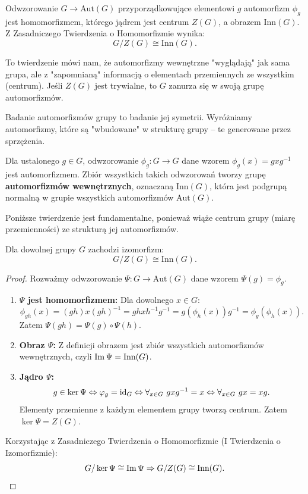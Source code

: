 \begin{theorem}
Odwzorowanie $G \to \text{Aut}(G)$ przyporządkowujące elementowi $g$ automorfizm $\phi_g$ jest homomorfizmem, którego jądrem jest centrum $Z(G)$, a obrazem $\text{Inn}(G)$.
Z Zasadniczego Twierdzenia o Homomorfizmie wynika:
\[ G / Z(G) \cong \text{Inn}(G). \]
\end{theorem}

\begin{proposition}
To twierdzenie mówi nam, że automorfizmy wewnętrzne "wyglądają" jak sama grupa, ale z "zapomnianą" informacją o elementach przemiennych ze wszystkim (centrum). Jeśli $Z(G)$ jest trywialne, to $G$ zanurza się w swoją grupę automorfizmów.
\end{proposition}

Badanie automorfizmów grupy to badanie jej symetrii. Wyróżniamy automorfizmy, które są "wbudowane" w strukturę grupy – te generowane przez sprzężenia.

\begin{definition}
Dla ustalonego $g \in G$, odwzorowanie $\phi_g: G \to G$ dane wzorem $\phi_g(x) = gxg^{-1}$ jest automorfizmem. Zbiór wszystkich takich odwzorowań tworzy grupę \textbf{automorfizmów wewnętrznych}, oznaczaną $\text{Inn}(G)$, która jest podgrupą normalną w grupie wszystkich automorfizmów $\text{Aut}(G)$.
\end{definition}

Poniższe twierdzenie jest fundamentalne, ponieważ wiąże centrum grupy (miarę przemienności) ze strukturą jej automorfizmów.

\begin{theorem}
Dla dowolnej grupy $G$ zachodzi izomorfizm:
\[ G / Z(G) \cong \text{Inn}(G). \]
\end{theorem}

\begin{proof}
Rozważmy odwzorowanie $\Psi: G \to \text{Aut}(G)$ dane wzorem $\Psi(g) = \phi_g$.
\begin{enumerate}
    \item \textbf{$\Psi$ jest homomorfizmem:}
    Dla dowolnego $x \in G$:
    \[ \phi_{gh}(x) = (gh)x(gh)^{-1} = ghxh^{-1}g^{-1} = g(\phi_h(x))g^{-1} = \phi_g(\phi_h(x)). \]
    Zatem $\Psi(gh) = \Psi(g) \circ \Psi(h)$.

    \item \textbf{Obraz $\Psi$:}
    Z definicji obrazem jest zbiór wszystkich automorfizmów wewnętrznych, czyli $\operatorname{Im} \Psi = \text{Inn}(G)$.

    \item \textbf{Jądro $\Psi$:}
    \[ g \in \ker \Psi \Leftrightarrow \varphi_g = \operatorname{id}_G \Leftrightarrow \forall_{x \in G} \ gxg^{-1} = x \Leftrightarrow \forall_{x \in G} \ gx = xg. \]
    Elementy przemienne z każdym elementem grupy tworzą centrum. Zatem $\ker \Psi = Z(G)$.
\end{enumerate}
Korzystając z Zasadniczego Twierdzenia o Homomorfizmie (I Twierdzenia o Izomorfizmie):
\[ G / \ker \Psi \cong \operatorname{Im} \Psi \Rightarrow G / Z(G) \cong \text{Inn}(G). \]
\end{proof}

